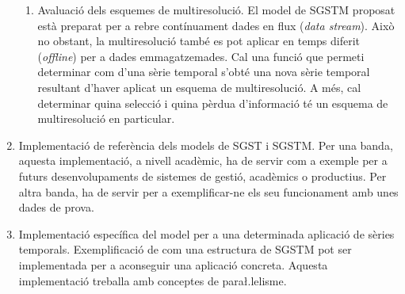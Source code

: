 \begin{enumerate}
\begin{enumerate}
  \item Avaluació dels esquemes de multiresolució.  El model de SGSTM
    proposat està preparat per a rebre contínuament dades en flux
    (\emph{data stream}). Això no obstant, la multiresolució també es
    pot aplicar en temps diferit (\emph{offline}) per a dades
    emmagatzemades. Cal una funció que permeti determinar com d'una
    sèrie temporal s'obté una nova sèrie temporal resultant d'haver
    aplicat un esquema de multiresolució. A més, cal determinar quina
    selecció i quina pèrdua d'informació té un esquema de
    multiresolució en particular.

  \end{enumerate}

\item Implementació de referència dels models de SGST i SGSTM. Per una
  banda, aquesta implementació, a nivell acadèmic, ha de servir com a
  exemple per a futurs desenvolupaments de sistemes de gestió,
  acadèmics o productius. Per altra banda, ha de servir per a
  exemplificar-ne els seu funcionament amb unes dades de prova.

\item Implementació específica del model per a una determinada
  aplicació de sèries temporals. Exemplificació de com una estructura
  de SGSTM pot ser implementada per a aconseguir una aplicació
  concreta. Aquesta implementació treballa amb conceptes de
  para\l.lelisme.

\end{enumerate} 









